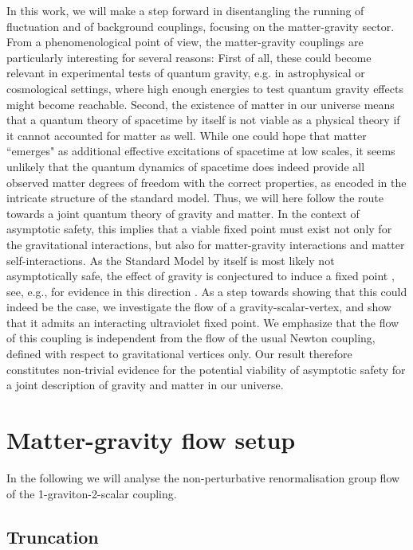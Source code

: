 \documentclass[11pt]{book} %
\numberwithin{equation}{chapter}
\begin{document}
In this work, we will make a step forward in disentangling the running of fluctuation and
of background couplings, focusing on the matter-gravity sector.
From a phenomenological point of view, the matter-gravity couplings are particularly interesting
for several reasons: First of all, these could become relevant in experimental tests of quantum gravity,
e.g. in astrophysical or cosmological settings,
where high enough energies to test quantum gravity effects might become reachable.
Second, the existence of matter in our universe means that a quantum theory
of spacetime by itself is not viable as a physical theory if it cannot accounted for matter as well.
While one could hope that matter ``emerges" as additional effective excitations of spacetime at low scales,
it seems unlikely that the quantum dynamics of spacetime does indeed provide all observed matter
degrees of freedom with the correct properties, as encoded in the intricate structure of the standard model.
Thus, we will here follow the route towards a joint quantum theory of gravity and matter.
In the context of asymptotic safety, this implies that a viable fixed point must exist not only
for the gravitational interactions, but also for matter-gravity interactions and matter self-interactions.
As the Standard Model by itself is most likely not asymptotically safe, the effect of gravity
is conjectured to  induce a fixed point \cite{Shaposhnikov:2009pv},
see, e.g., for evidence in this direction \cite{Zanusso:2009bs, Vacca:2010mj,
Harst:2011zx, Eichhorn:2011pc, Eichhorn:2012va,Oda:2015sma}.
As a step towards showing that this could indeed be the case,
we investigate the flow of a gravity-scalar-vertex,
and show that it admits an interacting ultraviolet fixed point.
We emphasize that the flow of this coupling is independent from the flow of the usual Newton coupling,
defined with respect to gravitational vertices only.
Our result therefore constitutes non-trivial evidence for the potential viability of asymptotic safety
for a joint description of gravity and matter in our universe.


\section{Matter-gravity flow setup}

In the following we will analyse the non-perturbative renormalisation group flow of the
1-graviton-2-scalar coupling.


\subsection{Truncation}
\end{document}
